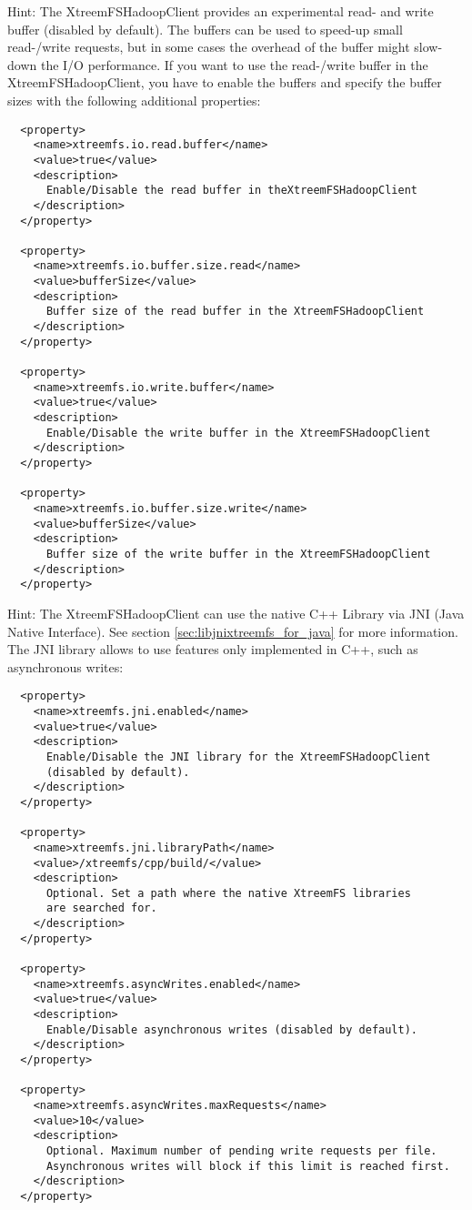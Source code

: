 \documentclass[a4paper,10pt]{book}
\begin{document}
\begin{enumerate}
\begin{enumerate}
	Hint: The XtreemFSHadoopClient provides an experimental read- and write buffer (disabled by default). The buffers can be used to speed-up small read-/write requests, but in some cases the overhead of the buffer might slow-down the I/O performance. If you want to use the read-/write buffer in the XtreemFSHadoopClient, you have to enable the buffers and specify the buffer sizes with the following additional properties:
	\begin{verbatim}
  <property>
    <name>xtreemfs.io.read.buffer</name>
    <value>true</value>
    <description>
      Enable/Disable the read buffer in theXtreemFSHadoopClient
    </description>
  </property>

  <property>
    <name>xtreemfs.io.buffer.size.read</name>
    <value>bufferSize</value>
    <description>
      Buffer size of the read buffer in the XtreemFSHadoopClient
    </description>
  </property>

  <property>
    <name>xtreemfs.io.write.buffer</name>
    <value>true</value>
    <description>
      Enable/Disable the write buffer in the XtreemFSHadoopClient
    </description>
  </property>

  <property>
    <name>xtreemfs.io.buffer.size.write</name>
    <value>bufferSize</value>
    <description>
      Buffer size of the write buffer in the XtreemFSHadoopClient
    </description>
  </property>
	\end{verbatim}


	Hint: The XtreemFSHadoopClient can use the native C++ Library via JNI (Java Native Interface). See section \ref{sec:libjnixtreemfs_for_java} for more information.
	The JNI library allows to use features only implemented in C++, such as asynchronous writes:
	\begin{verbatim}
  <property>
    <name>xtreemfs.jni.enabled</name>
    <value>true</value>
    <description>
      Enable/Disable the JNI library for the XtreemFSHadoopClient
      (disabled by default).
    </description>
  </property>

  <property>
    <name>xtreemfs.jni.libraryPath</name>
    <value>/xtreemfs/cpp/build/</value>
    <description>
      Optional. Set a path where the native XtreemFS libraries
      are searched for.
    </description>
  </property>

  <property>
    <name>xtreemfs.asyncWrites.enabled</name>
    <value>true</value>
    <description>
      Enable/Disable asynchronous writes (disabled by default).
    </description>
  </property>

  <property>
    <name>xtreemfs.asyncWrites.maxRequests</name>
    <value>10</value>
    <description>
      Optional. Maximum number of pending write requests per file.
      Asynchronous writes will block if this limit is reached first.
    </description>
  </property>
	\end{verbatim}
	\end{enumerate}


\end{enumerate}
\end{document}
